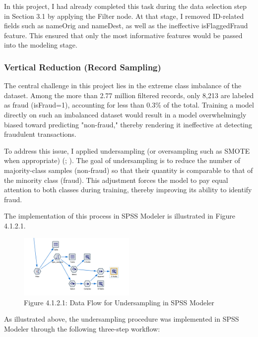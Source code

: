 \documentclass[sigplan,screen]{acmart}
\begin{document}
In this project, I had already completed this task during the data selection step in Section 3.1 by applying the Filter node. At that stage, I removed ID-related fields such as nameOrig and nameDest, as well as the ineffective isFlaggedFraud feature. This ensured that only the most informative features would be passed into the modeling stage.

\subsubsection{Vertical Reduction (Record Sampling)}

The central challenge in this project lies in the extreme class imbalance of the dataset. Among the more than 2.77 million filtered records, only 8,213 are labeled as fraud (isFraud=1), accounting for less than 0.3\% of the total. Training a model directly on such an imbalanced dataset would result in a model overwhelmingly biased toward predicting "non-fraud," thereby rendering it ineffective at detecting fraudulent transactions.

To address this issue, I applied undersampling (or oversampling such as SMOTE when appropriate) (\cite{he2009learning}; \cite{chawla2002smote}). The goal of undersampling is to reduce the number of majority-class samples (non-fraud) so that their quantity is comparable to that of the minority class (fraud). This adjustment forces the model to pay equal attention to both classes during training, thereby improving its ability to identify fraud.

The implementation of this process in SPSS Modeler is illustrated in Figure 4.1.2.1.

\begin{figure}[H]
    \centering
    \includegraphics[width=0.5\textwidth]{4.1.2.1.png}
    \caption*{Figure 4.1.2.1: Data Flow for Undersampling in SPSS Modeler}
    \label{fig:4.1.2.1}
\end{figure}

As illustrated above, the undersampling procedure was implemented in SPSS Modeler through the following three-step workflow:
\end{document}
